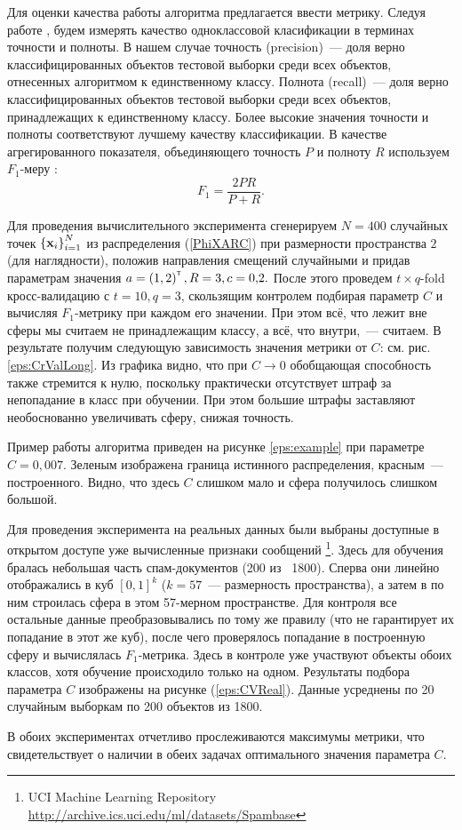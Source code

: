 Для оценки качества работы алгоритма предлагается ввести метрику. 
Следуя работе  \cite{Romanenko2012}, будем измерять качество одноклассовой класификации в терминах точности и полноты. 
В нашем случае точность (precision)~--- доля верно классифицированных объектов тестовой выборки среди всех объектов, отнесенных алгоритмом к единственному классу. 
Полнота (recall)~--- доля верно классифицированных объектов тестовой выборки среди всех объектов, принадлежащих к единственному классу. 
Более высокие значения точности и полноты соответствуют лучшему качеству классификации. 
В качестве агрегированного показателя, объединяющего точность $P$ и полноту $R$ используем $F_1$-меру \cite{Rijsbergen1979}:
$$F_1 = \frac{2PR}{P+R}.$$

Для проведения вычислительного эксперимента сгенерируем $N=400$ случайных точек $\left\{\boldsymbol{\mathbf{x}}_i\right\}_{i=1}^N$ из распределения (\ref{PhiXARC}) при размерности пространства $2$ (для наглядности), положив направления смещений случайными и придав параметрам значения $a = \left(1,2\right)^{\text{\tiny\sffamily\upshape\mdseries T}}, R = 3, c = 0{,}2.$
После этого проведем $t{\times}q$-fold кросс-валидацию с $t = 10, q = 3$, скользящим контролем подбирая параметр $C$ и вычисляя $F_1$-метрику при каждом его значении. При этом всё, что лежит вне сферы мы считаем не принадлежащим классу, а всё, что внутри,~--- считаем.
В результате получим следующую зависимость значения метрики от $C$: см. рис. \ref{eps:CrValLong}.
Из графика видно, что при $C\to 0$ обобщающая способность также стремится к нулю, поскольку практически отсутствует штраф за непопадание в класс при обучении. 
При этом большие штрафы заставляют необоснованно увеличивать сферу, снижая точность.

Пример работы алгоритма приведен на рисунке \ref{eps:example} при параметре $C = 0{,}007.$ 
Зеленым изображена граница истинного распределения, красным~--- построенного.
Видно, что здесь $C$ слишком мало и сфера получилось слишком большой.



Для проведения эксперимента на реальных данных были выбраны доступные в открытом доступе уже вычисленные признаки сообщений \footnote{UCI Machine Learning Repository \href{http://archive.ics.uci.edu/ml/datasets/Spambase}{http://archive.ics.uci.edu/ml/datasets/Spambase}}. 
Здесь для обучения бралась небольшая часть спам-документов (200 из ~1800). 
Сперва они линейно отображались в куб $[0, 1]^k$ ($k = 57$~--- размерность пространства), а затем в по ним строилась сфера в этом 57-мерном пространстве. 
Для контроля все остальные данные преобразовывались по тому же правилу (что не гарантирует их попадание в этот же куб), после чего проверялось попадание в построенную сферу и вычислялась $F_1$-метрика. 
Здесь в контроле уже участвуют объекты обоих классов, хотя обучение происходило только на одном. 
Результаты подбора параметра $C$ изображены на рисунке (\ref{eps:CVReal}). Данные усреднены по 20 случайным выборкам по 200 объектов из 1800.



В обоих экспериментах отчетливо прослеживаются максимумы метрики, что свидетельствует о наличии в обеих задачах оптимального значения параметра $C.$
